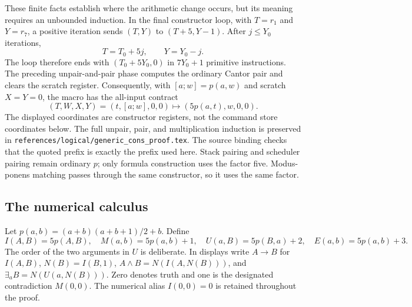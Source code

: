 These finite facts establish where the arithmetic change occurs, but its
meaning requires an unbounded induction. In the final constructor loop,
with $T=r_1$ and $Y=r_7$, a positive iteration sends
$(T,Y)$ to $(T+5,Y-1)$. After $j\leq Y_0$ iterations,
\[
                   T=T_0+5j,\qquad Y=Y_0-j.
\]
The loop therefore ends with $(T_0+5Y_0,0)$ in $7Y_0+1$ primitive
instructions. The preceding unpair-and-pair phase computes the ordinary
Cantor pair and clears the scratch register. Consequently, with
$[a;w]=p(a,w)$ and scratch $X=Y=0$, the macro has the all-input contract
\[
 (T,W,X,Y)=(t,[a;w],0,0)
 \longmapsto (5p(a,t),w,0,0).
\]
The displayed coordinates are constructor registers, not the command
store coordinates below. The full unpair, pair, and multiplication
induction is preserved in \texttt{references/logical/generic\_cons\_proof.tex}.
The source binding checks that the quoted prefix is exactly the prefix
used here. Stack pairing and scheduler pairing remain ordinary $p$;
only formula construction uses the factor five. Modus-ponens matching
passes through the same constructor, so it uses the same factor.

\subsection{The numerical calculus}

Let $p(a,b)=(a+b)(a+b+1)/2+b$. Define
\[
 I(A,B)=5p(A,B),\quad M(a,b)=5p(a,b)+1,\quad
 U(a,B)=5p(B,a)+2,\quad E(a,b)=5p(a,b)+3.
\]
The order of the two arguments in $U$ is deliberate. In displays write
$A\to B$ for $I(A,B)$, $N(B)=I(B,1)$,
$A\wedge B=N(I(A,N(B)))$, and $\exists_a B=N(U(a,N(B)))$.
Zero denotes truth and one is the designated contradiction $M(0,0)$.
The numerical alias $I(0,0)=0$ is retained throughout the proof.

